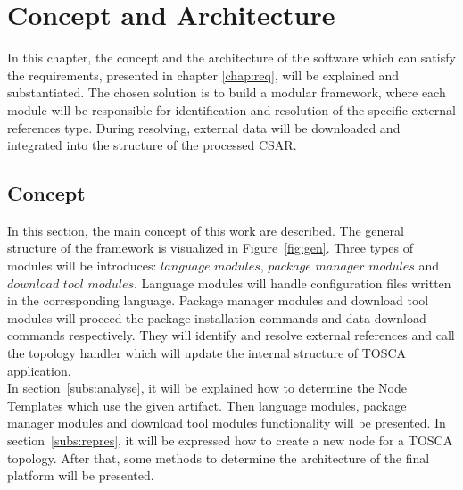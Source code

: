
\chapter{Concept and Architecture}\label{chap:conarch}
In this chapter, the concept and the architecture of the software which can satisfy the requirements, presented in chapter \ref{chap:req}, will be explained and substantiated.
The chosen solution is to build a modular framework, where each module will be responsible for identification and resolution of the specific external references type.
During resolving, external data will be downloaded and integrated into the structure of the processed CSAR.
\section{Concept}
In this section, the main concept of this work are described.
The general structure of the framework is visualized in Figure~\ref{fig:gen}. 
Three types of modules will be introduces: $language$ $modules$, $package$ $manager$ $modules$ and $download$ $tool$ $modules$.
Language modules will handle configuration files written in the corresponding language.
Package manager modules and download tool modules will proceed the package installation commands and data download commands respectively.
They will identify and resolve external references and call the topology handler which will update the internal structure of TOSCA application. \\
In section~\ref{subs:analyse}, it will be explained how to determine the Node Templates which use the given artifact.
Then language modules, package manager modules and download tool modules functionality will be presented.
In section~\ref{subs:repres}, it will be expressed how to create a new node for a TOSCA topology. 
After that, some methods to determine the architecture of the final platform will be presented.


